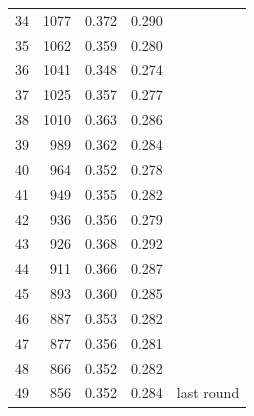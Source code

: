\documentclass[11pt]{article}
\begin{document}
\begin{longtable}{rrrrl}
34 & 1077 & 0.372 & 0.290 & \\
35 & 1062 & 0.359 & 0.280 & \\
36 & 1041 & 0.348 & 0.274 & \\
37 & 1025 & 0.357 & 0.277 & \\
38 & 1010 & 0.363 & 0.286 & \\
39 &  989 & 0.362 & 0.284 & \\
40 &  964 & 0.352 & 0.278 & \\
41 &  949 & 0.355 & 0.282 & \\
42 &  936 & 0.356 & 0.279 & \\
43 &  926 & 0.368 & 0.292 & \\
44 &  911 & 0.366 & 0.287 & \\
45 &  893 & 0.360 & 0.285 & \\
46 &  887 & 0.353 & 0.282 & \\
47 &  877 & 0.356 & 0.281 & \\
48 &  866 & 0.352 & 0.282 & \\
49 &  856 & 0.352 & 0.284 & last round \\
\bottomrule
\end{longtable}
\end{document}
